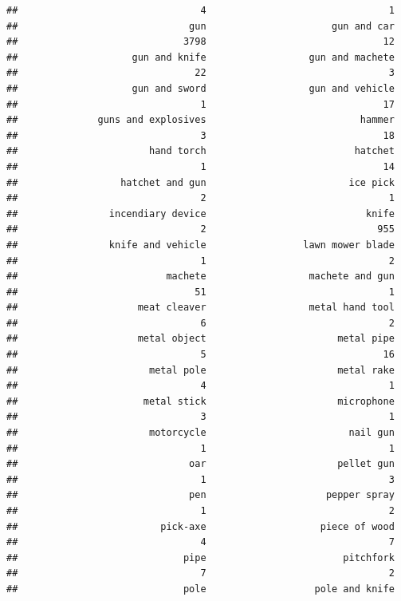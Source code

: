 \documentclass[
]{article}
\begin{document}
\begin{verbatim}
##                                4                                1 
##                              gun                      gun and car 
##                             3798                               12 
##                    gun and knife                  gun and machete 
##                               22                                3 
##                    gun and sword                  gun and vehicle 
##                                1                               17 
##              guns and explosives                           hammer 
##                                3                               18 
##                       hand torch                          hatchet 
##                                1                               14 
##                  hatchet and gun                         ice pick 
##                                2                                1 
##                incendiary device                            knife 
##                                2                              955 
##                knife and vehicle                 lawn mower blade 
##                                1                                2 
##                          machete                  machete and gun 
##                               51                                1 
##                     meat cleaver                  metal hand tool 
##                                6                                2 
##                     metal object                       metal pipe 
##                                5                               16 
##                       metal pole                       metal rake 
##                                4                                1 
##                      metal stick                       microphone 
##                                3                                1 
##                       motorcycle                         nail gun 
##                                1                                1 
##                              oar                       pellet gun 
##                                1                                3 
##                              pen                     pepper spray 
##                                1                                2 
##                         pick-axe                    piece of wood 
##                                4                                7 
##                             pipe                        pitchfork 
##                                7                                2 
##                             pole                   pole and knife 

\end{verbatim}
\end{document}
